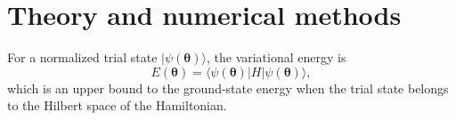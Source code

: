 \section{Theory and numerical methods}


For a normalized trial state $|\psi(\bm\theta)\rangle$, the variational energy is
\begin{equation}
E(\bm\theta)=\langle \psi(\bm\theta)|H|\psi(\bm\theta)\rangle,
\end{equation}
which is an upper bound to the ground-state energy when the trial state belongs to the Hilbert space of the Hamiltonian.
